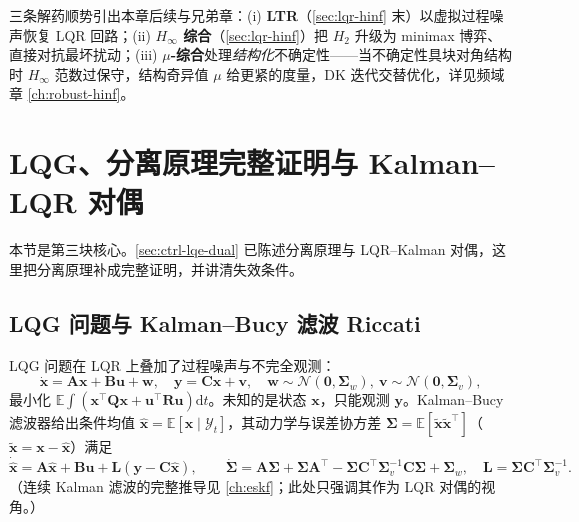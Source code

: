 三条解药顺势引出本章后续与兄弟章：(i) \textbf{LTR}（\cref{sec:lqr-hinf} 末）以虚拟过程噪声恢复 LQR 回路；(ii) \textbf{$H_\infty$ 综合}（\cref{sec:lqr-hinf}）把 $H_2$ 升级为 minimax 博弈、直接对抗最坏扰动；(iii) \textbf{$\mu$-综合}处理\emph{结构化}不确定性——当不确定性具块对角结构时 $H_\infty$ 范数过保守，结构奇异值 $\mu$ 给更紧的度量，DK 迭代交替优化，详见频域章 \cref{ch:robust-hinf}。

\section{LQG、分离原理完整证明与 Kalman--LQR 对偶}
\label{sec:lqr-separation}

本节是第三块核心。\cref{sec:ctrl-lqe-dual} 已陈述分离原理与 LQR--Kalman 对偶，这里把分离原理补成完整证明，并讲清失效条件。

\subsection{LQG 问题与 Kalman--Bucy 滤波 Riccati}
\label{sec:lqr-lqg-setup}

LQG 问题在 LQR 上叠加了过程噪声与不完全观测：
\begin{equation}
  \dot{\mathbf x}=\mathbf A\mathbf x+\mathbf B\mathbf u+\mathbf w,\quad \mathbf y=\mathbf C\mathbf x+\mathbf v,\quad \mathbf w\sim\mathcal N(\mathbf0,\boldsymbol\Sigma_w),\ \mathbf v\sim\mathcal N(\mathbf0,\boldsymbol\Sigma_v),
  \label{eq:lqr-lqg-plant}
\end{equation}
最小化 $\mathbb E\!\int(\mathbf x^\top\mathbf Q\mathbf x+\mathbf u^\top\mathbf R\mathbf u)\mathrm dt$。未知的是状态 $\mathbf x$，只能观测 $\mathbf y$。Kalman--Bucy 滤波器给出条件均值 $\hat{\mathbf x}=\mathbb E[\mathbf x\mid\mathcal Y_t]$，其动力学与误差协方差 $\boldsymbol\Sigma=\mathbb E[\tilde{\mathbf x}\tilde{\mathbf x}^\top]$（$\tilde{\mathbf x}=\mathbf x-\hat{\mathbf x}$）满足
\begin{equation}
  \dot{\hat{\mathbf x}}=\mathbf A\hat{\mathbf x}+\mathbf B\mathbf u+\mathbf L(\mathbf y-\mathbf C\hat{\mathbf x}),\qquad
  \dot{\boldsymbol\Sigma}=\mathbf A\boldsymbol\Sigma+\boldsymbol\Sigma\mathbf A^\top-\boldsymbol\Sigma\mathbf C^\top\boldsymbol\Sigma_v^{-1}\mathbf C\boldsymbol\Sigma+\boldsymbol\Sigma_w,\quad \mathbf L=\boldsymbol\Sigma\mathbf C^\top\boldsymbol\Sigma_v^{-1}.
  \label{eq:lqr-kbf}
\end{equation}
（连续 Kalman 滤波的完整推导见 \cref{ch:eskf}；此处只强调其作为 LQR 对偶的视角。）

